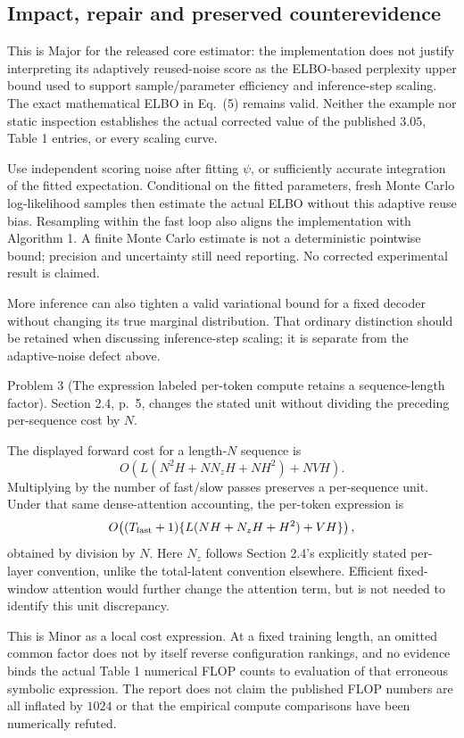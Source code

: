 \documentclass[10pt]{article}
\begin{document}
\subsection*{Impact, repair and preserved counterevidence}
This is Major for the released core estimator: the implementation does not justify interpreting its adaptively reused-noise score as the ELBO-based perplexity upper bound used to support sample/parameter efficiency and inference-step scaling. The exact mathematical ELBO in Eq. (5) remains valid. Neither the example nor static inspection establishes the actual corrected value of the published \(3.05\), Table 1 entries, or every scaling curve.\par
Use independent scoring noise after fitting \(\psi\), or sufficiently accurate integration of the fitted expectation. Conditional on the fitted parameters, fresh Monte Carlo log-likelihood samples then estimate the actual ELBO without this adaptive reuse bias. Resampling within the fast loop also aligns the implementation with Algorithm 1. A finite Monte Carlo estimate is not a deterministic pointwise bound; precision and uncertainty still need reporting. No corrected experimental result is claimed.\par
More inference can also tighten a valid variational bound for a fixed decoder without changing its true marginal distribution. That ordinary distinction should be retained when discussing inference-step scaling; it is separate from the adaptive-noise defect above.\par
Problem 3 (The expression labeled per-token compute retains a sequence-length factor).  Section 2.4, p. 5, changes the stated unit without dividing the preceding per-sequence cost by \(N\).\par
The displayed forward cost for a length-\(N\) sequence is \[O\!\left(L(N^2H+NN_zH+NH^2)+NVH\right).\] Multiplying by the number of fast/slow passes preserves a per-sequence unit. Under that same dense-attention accounting, the per-token expression is \[O\!\left((T_{\rm fast}+1)
 \{L(NH+N_zH+H^2)+VH\}\right),\] obtained by division by \(N\). Here \(N_z\) follows Section 2.4’s explicitly stated per-layer convention, unlike the total-latent convention elsewhere. Efficient fixed-window attention would further change the attention term, but is not needed to identify this unit discrepancy.\par
This is Minor as a local cost expression. At a fixed training length, an omitted common factor does not by itself reverse configuration rankings, and no evidence binds the actual Table 1 numerical FLOP counts to evaluation of that erroneous symbolic expression. The report does not claim the published FLOP numbers are all inflated by \(1024\) or that the empirical compute comparisons have been numerically refuted.\par
\end{document}
